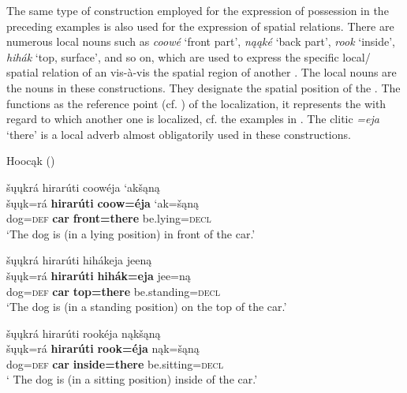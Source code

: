 \documentclass[output=paper]{LSP/langsci}
\begin{document}
The same type of construction employed for the expression of possession in the preceding examples is also used for the expression of spatial relations. There are numerous local nouns such as \textit{coow\'e}  `front part', \textit{n\k{a}\k{a}k\'e} `back part', \textit{rook} `inside', \textit{hihák} `top, surface', and so on, which are used to express the specific local/ spatial relation of an  vis-à-vis the spatial region of another . The local nouns are the  nouns in these constructions. They designate the spatial position of the . The  functions as the reference point (cf. \citealt{Langacker1993}) of the localization, it represents the  with regard to which another one is localized, cf. the examples in . The clitic \textit{=eja} `there' is a local adverb almost obligatorily used in these constructions. 
 
\ea Hooc\k{a}k (\citealt[14]{Helmbrecht2003}) \label{dogposition}

\ea 
\glll \v{s}\k{u}\k{u}kr\'a hirar\'uti  coow\'eja `ak\v{s}\k{a}n\k{a}  \\
\v{s}\k{u}\k{u}k=r\'a \textbf{hirar\'uti}  \textbf{coow=\'eja} `ak=\v{s}\k{a}n\k{a} \\ 
dog=\textsc{def} \textbf{car} \textbf{front=there} be.lying=\textsc{decl} \\
\glt `The dog is (in a lying position) in front of the car.'

\ex 
\glll šųųkrá hirarúti hihákeja jeen\k{a}\\
\v{s}\k{u}\k{u}k=r\'a \textbf{hirar\'uti} \textbf{hih\'ak=eja} jee=n\k{a} \\
dog=\textsc{def}  \textbf{car} \textbf{top=there} be.standing=\textsc{decl} \\
\glt `The dog is (in a standing position) on the top of the car.'

\ex 
\glll šųųkrá hirarúti rookéja n\k{a}k\v{s}\k{a}n\k{a}\\
\v{s}\k{u}\k{u}k=r\'a   \textbf{hirar\'uti} \textbf{rook=\'eja} n\k{a}k=\v{s}\k{a}n\k{a} \\
dog=\textsc{def} \textbf{car} \textbf{inside=there} be.sitting=\textsc{decl} \\
\glt` The dog is (in a sitting position) inside of the car.'
\z
\z
\end{document}
